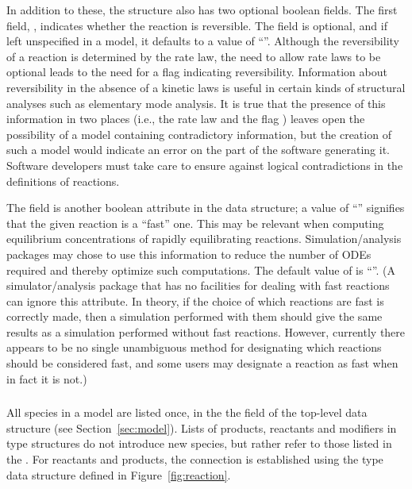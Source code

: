 \documentclass[10pt,twocolumntoc]{cekarticle}
\newcommand{\vref}[1]{\ref{#1}}
\begin{document}
In addition to these, the  structure also has two optional
boolean fields.  The first field, , indicates whether
the reaction is reversible.  The field is optional, and if left unspecified
in a model, it defaults to a value of ``''.  Although the
reversibility of a reaction is determined by the rate law, the need to
allow rate laws to be optional leads to the need for a flag indicating
reversibility.  Information about reversibility in the absence of a kinetic
laws is useful in certain kinds of structural analyses such as elementary
mode analysis.  It is true that the presence of this information in two
places (i.e., the rate law and the flag ) leaves open
the possibility of a model containing contradictory information, but the
creation of such a model would indicate an error on the part of the
software generating it.  Software developers must take care to ensure
against logical contradictions in the definitions of reactions.

The field  is another boolean attribute in the
 data structure; a value of ``''
signifies that the given reaction is a ``fast'' one.  This may be relevant
when computing equilibrium concentrations of rapidly equilibrating
reactions.  Simulation/analysis packages may chose to use this information
to reduce the number of ODEs required and thereby optimize such
computations.  The default value of  is
``''.  (A simulator/analysis package that has no
facilities for dealing with fast reactions can ignore this attribute. In
theory, if the choice of which reactions are fast is correctly made, then a
simulation performed with them should give the same results as a simulation
performed without fast reactions.  However, currently there appears to be
no single unambiguous method for designating which reactions should be
considered fast, and some users may designate a reaction as fast when in
fact it is not.)

\subsubsection{}
\label{subsec:speciesreference}

All species in a model are listed once, in the the 
field of the top-level  data structure (see
Section~\ref{sec:model}).  Lists of products, reactants and modifiers in
 type structures do not introduce new species, but rather
refer to those listed in the .  For reactants and products,
the connection is established using the  type data
structure defined in Figure~\vref{fig:reaction}.
\end{document}
